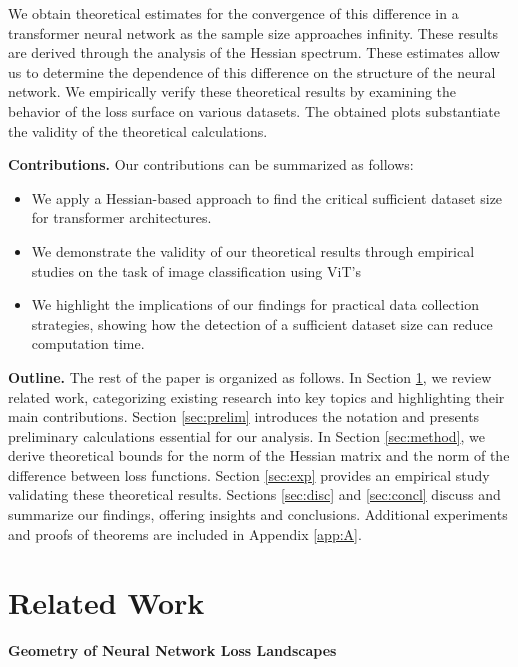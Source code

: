 \documentclass{article}
\begin{document}
We obtain theoretical estimates for the convergence of this difference in a transformer neural
network as the sample size approaches infinity. These results are derived through the analysis of the
Hessian spectrum. These estimates allow us to determine the dependence of this difference on the
structure of the neural network. We
empirically verify these theoretical results by examining the behavior of the loss surface on various
datasets. The obtained plots substantiate the validity of the theoretical calculations.

\textbf{Contributions.} Our contributions can be summarized as follows:
\begin{itemize}
    \item We apply a Hessian-based approach to
        find the critical sufficient dataset size for transformer architectures.
    \item We demonstrate the validity of our theoretical results through empirical studies on the task of image classification using ViT's
    \item We highlight the implications of our findings for practical data collection strategies, showing how the detection of
        a sufficient dataset size can reduce computation time.
\end{itemize}

\textbf{Outline.} The rest of the paper is organized as follows. In Section  \ref{sec:rw}, we review related work, categorizing existing research into key topics and highlighting their main contributions. Section \ref{sec:prelim} introduces the notation and presents preliminary calculations essential for our analysis. In Section \ref{sec:method}, we derive theoretical bounds for the norm of the Hessian matrix and the norm of the difference between loss functions. Section \ref{sec:exp} provides an empirical study validating these theoretical results. Sections \ref{sec:disc} and \ref{sec:concl} discuss and summarize our findings, offering insights and conclusions. Additional experiments and proofs of theorems are included in Appendix \ref{app:A}.

\section{Related Work}\label{sec:rw}

\textbf{Geometry of Neural Network Loss Landscapes}
\end{document}
